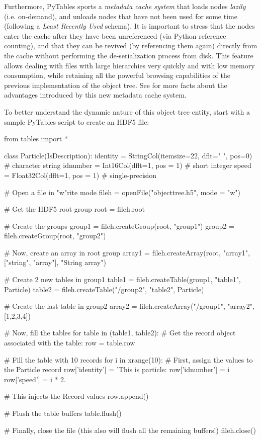 Furthermore, PyTables sports a \emph{metadata
cache system} that loads nodes \emph{lazily}
(i.e. on-demand), and unloads nodes that have not been used for some
time (following a \emph{Least Recently Used} schema). It
is important to stress that the nodes enter the cache after they
have been unreferenced (via Python reference counting),
and that they can be revived (by referencing them again) directly from
the cache without performing the de-serialization process from
disk. This feature allows dealing with files with large hierarchies
very quickly and with low memory consumption, while retaining all the
powerful browsing capabilities of the previous implementation of the
object tree. See \cite{Alted2005} for
more facts about the advantages introduced by this new metadata cache
system.

To better understand the dynamic nature of this object tree
entity, start with a sample PyTables script to create an HDF5
file:

\vspace{2.5mm}
\begin{python}
from tables import *

class Particle(IsDescription):
    identity = StringCol(itemsize=22, dflt=" ", pos=0)  # character string
    idnumber = Int16Col(dflt=1, pos = 1)  # short integer
    speed    = Float32Col(dflt=1, pos = 1)  # single-precision

# Open a file in "w"rite mode
fileh = openFile("objecttree.h5", mode = "w")

# Get the HDF5 root group
root = fileh.root

# Create the groups
group1 = fileh.createGroup(root, "group1")
group2 = fileh.createGroup(root, "group2")

# Now, create an array in root group
array1 = fileh.createArray(root, "array1", ["string", "array"], "String array")

# Create 2 new tables in group1
table1 = fileh.createTable(group1, "table1", Particle)
table2 = fileh.createTable("/group2", "table2", Particle)

# Create the last table in group2
array2 = fileh.createArray("/group1", "array2", [1,2,3,4])

# Now, fill the tables
for table in (table1, table2):
    # Get the record object associated with the table:
    row = table.row

    # Fill the table with 10 records
    for i in xrange(10):
        # First, assign the values to the Particle record
        row['identity']  = 'This is particle: %
        row['idnumber'] = i
        row['speed']  = i * 2.

        # This injects the Record values
        row.append()

    # Flush the table buffers
    table.flush()

# Finally, close the file (this also will flush all the remaining buffers!)
fileh.close()
\end{python}
\vspace{2.5mm}


